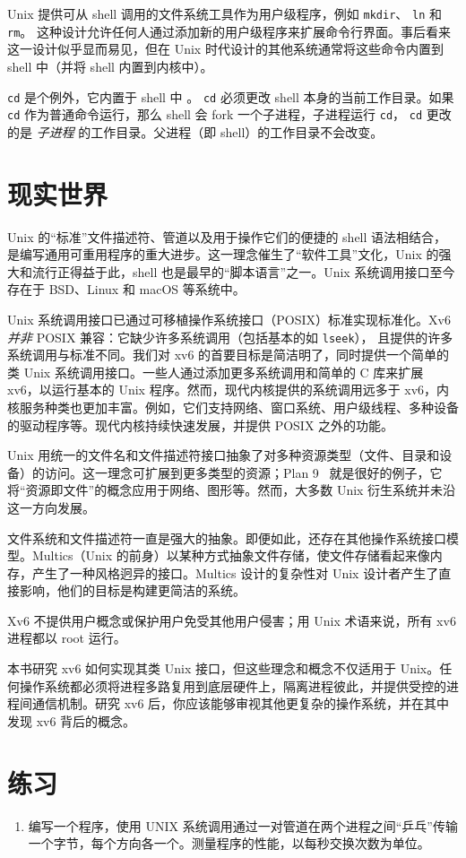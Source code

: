 Unix 提供可从 shell 调用的文件系统工具作为用户级程序，例如
\lstinline{mkdir}、
\lstinline{ln}
和
\lstinline{rm}。
这种设计允许任何人通过添加新的用户级程序来扩展命令行界面。事后看来这一设计似乎显而易见，但在 Unix 时代设计的其他系统通常将这些命令内置到 shell 中（并将 shell 内置到内核中）。

\lstinline{cd}
是个例外，它内置于 shell 中
。
\lstinline{cd}
必须更改 shell 本身的当前工作目录。如果
\lstinline{cd}
作为普通命令运行，那么 shell 会 fork 一个子进程，子进程运行
\lstinline{cd}，
\lstinline{cd}
更改的是
\textit{子进程}
的工作目录。父进程（即 shell）的工作目录不会改变。
\section{现实世界}

Unix 的``标准''文件描述符、管道以及用于操作它们的便捷的 shell 语法相结合，是编写通用可重用程序的重大进步。这一理念催生了``软件工具''文化，Unix 的强大和流行正得益于此，shell 也是最早的``脚本语言''之一。Unix 系统调用接口至今存在于 BSD、Linux 和 macOS 等系统中。

Unix 系统调用接口已通过可移植操作系统接口（POSIX）标准实现标准化。Xv6
\textit{并非}
POSIX 兼容：它缺少许多系统调用（包括基本的如
\lstinline{lseek}），
且提供的许多系统调用与标准不同。我们对 xv6 的首要目标是简洁明了，同时提供一个简单的类 Unix 系统调用接口。一些人通过添加更多系统调用和简单的 C 库来扩展 xv6，以运行基本的 Unix 程序。然而，现代内核提供的系统调用远多于 xv6，内核服务种类也更加丰富。例如，它们支持网络、窗口系统、用户级线程、多种设备的驱动程序等。现代内核持续快速发展，并提供 POSIX 之外的功能。

Unix 用统一的文件名和文件描述符接口抽象了对多种资源类型（文件、目录和设备）的访问。这一理念可扩展到更多类型的资源；Plan 9~\cite{Presotto91plan9} 就是很好的例子，它将``资源即文件''的概念应用于网络、图形等。然而，大多数 Unix 衍生系统并未沿这一方向发展。

文件系统和文件描述符一直是强大的抽象。即便如此，还存在其他操作系统接口模型。Multics（Unix 的前身）以某种方式抽象文件存储，使文件存储看起来像内存，产生了一种风格迥异的接口。Multics 设计的复杂性对 Unix 设计者产生了直接影响，他们的目标是构建更简洁的系统。

Xv6 不提供用户概念或保护用户免受其他用户侵害；用 Unix 术语来说，所有 xv6 进程都以 root 运行。

本书研究 xv6 如何实现其类 Unix 接口，但这些理念和概念不仅适用于 Unix。任何操作系统都必须将进程多路复用到底层硬件上，隔离进程彼此，并提供受控的进程间通信机制。研究 xv6 后，你应该能够审视其他更复杂的操作系统，并在其中发现 xv6 背后的概念。

\section{练习}

\begin{enumerate}

\item 编写一个程序，使用 UNIX 系统调用通过一对管道在两个进程之间``乒乓''传输一个字节，每个方向各一个。测量程序的性能，以每秒交换次数为单位。

\end{enumerate}
